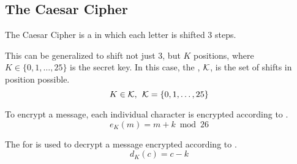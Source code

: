 \subsection{The Caesar Cipher}\label{subsec:The_Caesar_Cipher}
The Caesar Cipher is a  in which each letter is shifted 3 steps.

This can be generalized to shift not just 3, but $K$ positions, where $K \in \lbrace 0, 1, \ldots, 25 \rbrace$ is the secret key.
In this case, the , $\operatorname{\mathcal{K}}$, is the set of shifts in position possible.
\begin{equation*}
  K \in \operatorname{\mathcal{K}}, \:\: \operatorname{\mathcal{K}} = \lbrace 0, 1, \ldots, 25 \rbrace
\end{equation*}

To encrypt a message, each individual character is encrypted according to .
\begin{equation}\label{eq:The_Caesar_Cipher-Encryption}
  e_{K}(m) = m + k \bmod 26
\end{equation}

The  for  is used to decrypt a message encrypted according to .
\begin{equation}\label{eq:The_Caesar_Cipher-Decryption}
  d_{K}(c) = c - k
\end{equation}


